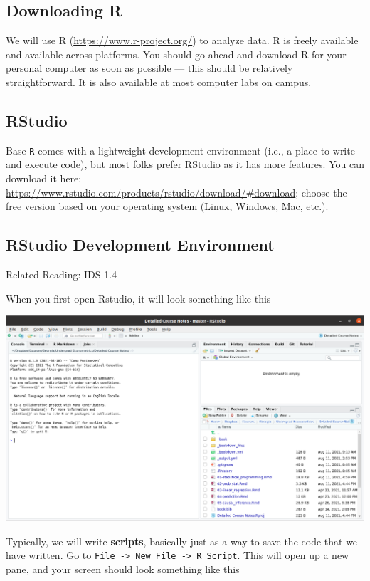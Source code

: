 \documentclass[
  letterpaper,
  DIV=11,
  numbers=noendperiod]{scrreprt}
\begin{document}
\subsection{Downloading R}\label{downloading-r}

We will use R (\url{https://www.r-project.org/}) to analyze data. R is
freely available and available across platforms. You should go ahead and
download R for your personal computer as soon as possible --- this
should be relatively straightforward. It is also available at most
computer labs on campus.

\subsection{RStudio}\label{rstudio}

Base \texttt{R} comes with a lightweight development environment (i.e.,
a place to write and execute code), but most folks prefer RStudio as it
has more features. You can download it here:
\url{https://www.rstudio.com/products/rstudio/download/\#download};
choose the free version based on your operating system (Linux, Windows,
Mac, etc.).

\subsection{RStudio Development
Environment}\label{rstudio-development-environment}

Related Reading: IDS 1.4

When you first open Rstudio, it will look something like this

\includegraphics{open_rstudio.png}

Typically, we will write \textbf{scripts}, basically just as a way to
save the code that we have written. Go to
\texttt{File\ -\textgreater{}\ New\ File\ -\textgreater{}\ R\ Script}.
This will open up a new pane, and your screen should look something like
this
\end{document}

